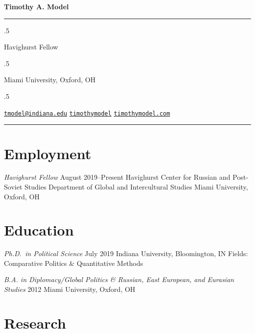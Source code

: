 \documentclass[11pt,]{article}
\begin{document}
\centerline{\huge \bf Timothy A. Model}

\vspace{2 mm}

\hrule

\vspace{2 mm}

\moveleft.5\hoffset\centerline{Havighurst Fellow}
\moveleft.5\hoffset\centerline{Miami University, Oxford, OH}
\moveleft.5\hoffset\centerline{ \faEnvelopeO \hspace{1 mm} \href{mailto:}{\tt \href{mailto:tmodel@indiana.edu}{\nolinkurl{tmodel@indiana.edu}}} \hspace{1 mm}  \faGithub \hspace{1 mm} \href{http://github.com/timothymodel}{\tt timothymodel} \hspace{1 mm}    \faGlobe \hspace{1 mm} \href{http://timothymodel.com}{\tt timothymodel.com}   }

\vspace{2 mm}

\hrule


\hypertarget{employment}{%
\section{Employment}\label{employment}}

\emph{Havighurst Fellow} \hfill August 2019--Present \newline Havighurst
Center for Russian and Post-Soviet Studies \hfill \newline Department of
Global and Intercultural Studies \hfill \newline Miami University,
Oxford, OH

\hypertarget{education}{%
\section{Education}\label{education}}

\emph{Ph.D.~in Political Science} \hfill July 2019 \newline Indiana
University, Bloomington, IN \hfill \newline Fields: Comparative Politics
\& Quantitative Methods

\emph{B.A. in Diplomacy/Global Politics \& Russian, East European, and
Eurasian Studies} \hfill 2012 \newline Miami University, Oxford, OH

\hypertarget{research}{%
\section{Research}\label{research}}
\end{document}
